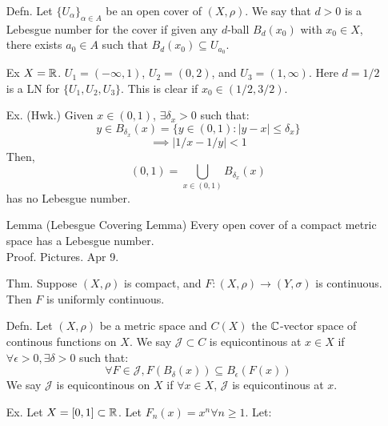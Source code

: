 \documentclass[12pt]{article}
\begin{document}


\begin{itemize}
    \item[Defn.] Let $\{U_\alpha\}_{\alpha \in A}$ be an open cover of $(X, \rho)$. We say that $d > 0$ is a Lebesgue number for the cover if given any $d$-ball $B_d(x_0)$ with $x_0 \in X$, there exists $a_0 \in A$ such that $B_d(x_0) \subseteq U_{a_0}$. 
    \item[Ex] $X = \mathbb R$. $U_1 = (-\infty, 1)$, $U_2 = (0, 2)$, and $U_3 = (1, \infty)$. Here $d = 1/2$ is a LN for $\{U_1, U_2, U_3\}$. This is clear if $x_0 \in (1/2, 3/2)$. 
    \item[Ex. (Hwk.)] Given $x \in (0, 1)$, $\exists \delta_x > 0$ such that:
    \[ y \in B_{\delta_x}(x) = \{y \in (0, 1): |y-x| \leq \delta_x\} \]
    \[ \implies |1/x - 1/y| < 1 \]
    Then, 
    \[ (0, 1) = \bigcup_{x \in (0, 1)} B_{\delta_x}(x) \]
    has no Lebesgue number.
    \item[Lemma] (Lebesgue Covering Lemma) Every open cover of a compact metric space has a Lebesgue number. \\ 
    Proof. Pictures. Apr 9.
    \item[Thm.] Suppose $(X, \rho)$ is compact, and $F: (X, \rho) \to (Y, \sigma)$ is continuous. Then $F$ is uniformly continuous.
    \item[Defn. ] Let $(X, \rho)$ be a metric space and $C(X)$ the $\mathbb C$-vector space of continous functions on $X$. We say $\mathcal{J} \subset C$ is equicontinous at $x \in X$ if $\forall \epsilon > 0, \exists \delta > 0$ such that:
    \[ \forall F \in \mathcal{J}, F(B_\delta(x)) \subseteq B_\epsilon(F(x)) \]
    We say $\mathcal{J}$ is equicontinous on $X$ if $\forall x \in X$, $\mathcal{J}$ is equicontinous at $x$.
    \item[Ex.] Let $X = [0, 1] \subset \mathbb R$. Let $F_n(x) = x^n \forall n \geq 1$. Let:

\end{itemize}
\end{document}
